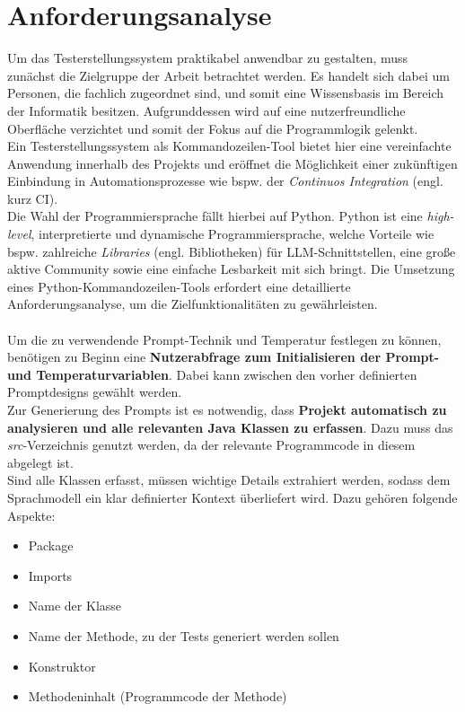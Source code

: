 \section{Anforderungsanalyse}\label{section:anford}
Um das Testerstellungssystem praktikabel anwendbar zu gestalten, muss zunächst die Zielgruppe der Arbeit betrachtet werden. Es handelt sich dabei um Personen, die fachlich zugeordnet sind, und somit eine Wissensbasis im Bereich der Informatik besitzen. Aufgrunddessen wird auf eine nutzerfreundliche Oberfläche verzichtet und somit der Fokus auf die Programmlogik gelenkt.\\ Ein Testerstellungssystem als Kommandozeilen-Tool bietet hier eine vereinfachte Anwendung innerhalb des Projekts und eröffnet die Möglichkeit einer zukünftigen Einbindung in Automationsprozesse wie bspw. der \textit{Continuos Integration} (engl. kurz CI).\\ Die Wahl der Programmiersprache fällt hierbei auf Python. Python ist eine \textit{high-level}, interpretierte und dynamische Programmiersprache, welche Vorteile wie bspw. zahlreiche \textit{Libraries} (engl. Bibliotheken) für LLM-Schnittstellen, eine große aktive Community sowie eine einfache Lesbarkeit mit sich bringt. \cite*{PythonLanguageAdvantages2017} Die Umsetzung eines Python-Kommandozeilen-Tools erfordert eine detaillierte Anforderungsanalyse, um die Zielfunktionalitäten zu gewährleisten.\\\\
Um die zu verwendende Prompt-Technik und Temperatur festlegen zu können, benötigen zu Beginn eine \textbf{Nutzerabfrage zum Initialisieren der Prompt- und Temperaturvariablen}. Dabei kann zwischen den vorher definierten Promptdesigns gewählt werden. \\ Zur Generierung des Prompts ist es notwendig, dass \textbf{Projekt automatisch zu analysieren und alle relevanten Java Klassen zu erfassen}. Dazu muss das \textit{src}-Verzeichnis genutzt werden, da der relevante Programmcode in diesem abgelegt ist.\\ Sind alle Klassen erfasst, müssen wichtige Details extrahiert werden, sodass dem Sprachmodell ein klar definierter Kontext überliefert wird. Dazu gehören folgende Aspekte:
\begin{itemize}
    \setlength{\parskip}{1pt}
    \item Package
    \item Imports
    \item Name der Klasse
    \item Name der Methode, zu der Tests generiert werden sollen
    \item Konstruktor
    \item Methodeninhalt (Programmcode der Methode)
\end{itemize}
